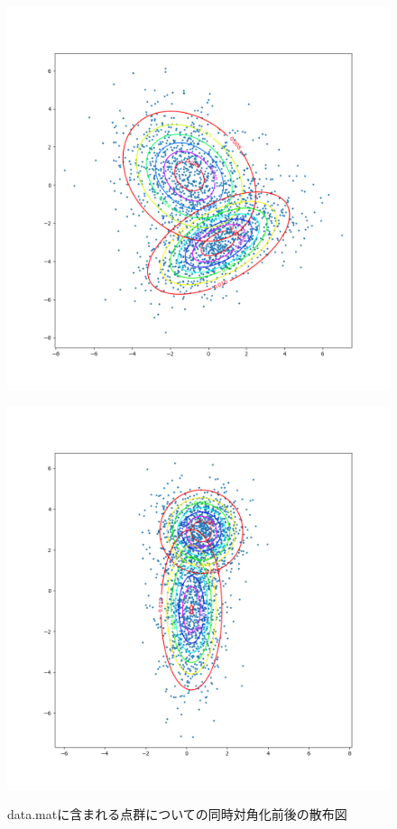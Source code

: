 \documentclass[dvipdfmx, fleqn]{jsarticle}
\begin{document}
\begin{figure}
	\begin{minipage}[b]{0.45\linewidth}
		\centering
		\includegraphics[clip, width=\linewidth]{../figures/scatter_before_1}
		\label{fig:scatter_before_1}
	\end{minipage}
	\begin{minipage}[b]{0.45\linewidth}
		\centering
		\includegraphics[clip, width=\linewidth]{../figures/scatter_after_1}
		\label{fig:scatter_after_1}
	\end{minipage}
	\caption{data.matに含まれる点群についての同時対角化前後の散布図}
	\label{fig:data.mat_result}
\end{figure}
\end{document}
